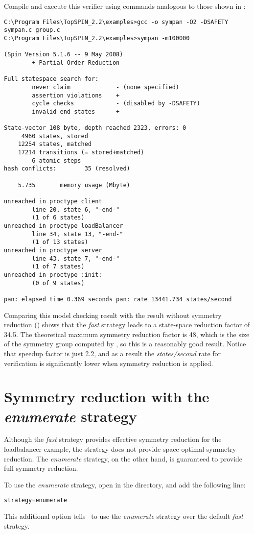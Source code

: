 Compile and execute this verifier using commands analogous to those
shown in :
%
\begin{lstlisting}
C:\Program Files\TopSPIN_2.2\examples>gcc -o sympan -O2 -DSAFETY sympan.c group.c
C:\Program Files\TopSPIN_2.2\examples>sympan -m100000

(Spin Version 5.1.6 -- 9 May 2008)
        + Partial Order Reduction

Full statespace search for:
        never claim             - (none specified)
        assertion violations    +
        cycle checks            - (disabled by -DSAFETY)
        invalid end states      +

State-vector 108 byte, depth reached 2323, errors: 0
     4960 states, stored
    12254 states, matched
    17214 transitions (= stored+matched)
        6 atomic steps
hash conflicts:        35 (resolved)

    5.735       memory usage (Mbyte)

unreached in proctype client
        line 20, state 6, "-end-"
        (1 of 6 states)
unreached in proctype loadBalancer
        line 34, state 13, "-end-"
        (1 of 13 states)
unreached in proctype server
        line 43, state 7, "-end-"
        (1 of 7 states)
unreached in proctype :init:
        (0 of 9 states)

pan: elapsed time 0.369 seconds pan: rate 13441.734 states/second
\end{lstlisting}
%
Comparing this model checking result with the result without
symmetry reduction () shows that the
\emph{fast} strategy leads to a state-space reduction factor of
34.5.  The theoretical maximum symmetry reduction factor is 48,
which is the size of the symmetry group computed by \topspin, so
this is a reasonably good result.  Notice that speedup factor is
just 2.2, and as a result the \emph{states/second} rate for
verification is significantly lower when symmetry reduction is
applied.
%
\section{Symmetry reduction with the \emph{enumerate} strategy}\label{sec:example:enumerate}
%
Although the \emph{fast} strategy provides effective symmetry
reduction for the loadbalancer example, the strategy does not
provide space-optimal symmetry reduction. The \emph{enumerate}
strategy, on the other hand, is guaranteed to provide full symmetry
reduction.

To use the \emph{enumerate} strategy, open  in
the  directory, and add the following line:
%
\begin{lstlisting}
strategy=enumerate
\end{lstlisting}
%
This additional option tells \topspin\ to use the \emph{enumerate}
strategy over the default \emph{fast} strategy.


